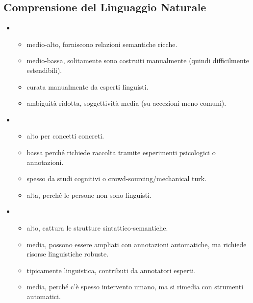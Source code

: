 \subsection{Comprensione del Linguaggio Naturale}

\begin{itemize}
  \item {}
    \begin{itemize}
      \item {} medio-alto, forniscono relazioni semantiche ricche. 
      \item {} medio-bassa, solitamente sono costruiti manualmente (quindi difficilmente estendibili).
      \item {} curata manualmente da esperti linguisti.
      \item {} ambiguità ridotta, soggettività media (su accezioni meno comuni).
    \end{itemize}
  \item {}
    \begin{itemize}
      \item {} alto per concetti concreti.
      \item {} bassa perché richiede raccolta tramite esperimenti psicologici o annotazioni.
      \item {} spesso da studi cognitivi o crowd-sourcing/mechanical turk.
      \item {} alta, perché le persone non sono linguisti.
    \end{itemize}
  \item {}
    \begin{itemize}
      \item {} alto, cattura le strutture sintattico-semantiche. 
      \item {} media, possono essere ampliati con annotazioni automatiche, ma richiede risorse linguistiche robuste.
      \item {} tipicamente linguistica, contributi da annotatori esperti. 
      \item {} media, perché c'è spesso intervento umano, ma si rimedia con strumenti automatici.
    \end{itemize}

\end{itemize}
